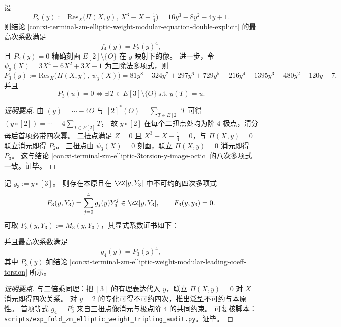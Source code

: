 \begin{conclusion}\label{con:xi-terminal-zm-elliptic-weight-modular-leading-coeff-torsion}
设
\[
P_2(y):=\mathrm{Res}_{X}\!\bigl(\Pi(X,y),\,X^{3}-X+\tfrac14\bigr)=16y^{3}-8y^{2}-4y+1.
\]
则结论 \ref{con:xi-terminal-zm-elliptic-weight-modular-equation-double-explicit} 的最高次系数满足
\[
f_4(y)=P_2(y)^4,
\]
且 \(P_2(y)=0\) 精确刻画 \(E[2]\setminus\{O\}\) 在 \(y\)-映射下的像。
进一步，令 \(\psi_3(X)=3X^4-6X^2+3X-1\) 为三除法多项式，则
\[
P_3(y):=\mathrm{Res}_{X}\!\bigl(\Pi(X,y),\,\psi_3(X)\bigr)
=81y^8-324y^7+297y^6+729y^5-216y^4-1395y^3-480y^2-120y+7,
\]
并且
\[
P_3(u)=0
\Longleftrightarrow
\exists\,T\in E[3]\setminus\{O\}\ \text{s.t.}\ y(T)=u.
\]
\end{conclusion}
\begin{proof}[证明要点]
由 \((y)=\cdots-4O\) 与 \([2]^*(O)=\sum_{T\in E[2]}T\) 可得
\((y\circ[2])=\cdots-4\sum_{T\in E[2]}T\)，
故 \(y\circ[2]\) 在每个二扭点处均为阶 \(4\) 极点，清分母后首项必带四次幂。
二扭点满足 \(Z=0\) 且 \(X^3-X+\tfrac14=0\)，与 \(\Pi(X,y)=0\) 联立消元即得 \(P_2\)。
三扭点由 \(\psi_3(X)=0\) 刻画，联立 \(\Pi(X,y)=0\) 消元即得 \(P_3\)。
这与结论 \ref{con:xi-terminal-zm-elliptic-3torsion-y-image-octic} 的八次多项式一致。证毕。
\end{proof}

\begin{conclusion}\label{con:xi-terminal-zm-elliptic-weight-modular-equation-triple-explicit}
记 \(y_3:=y\circ[3]\)。
则存在本原且在 \(\ZZ[y,Y_3]\) 中不可约的四次多项式
\[
F_3(y,Y_3)=\sum_{j=0}^{4}g_j(y)Y_3^j\in\ZZ[y,Y_3],
\qquad
F_3(y,y_3)=0.
\]
可取 \(F_3(y,Y_3):=M_3(y,Y_3)\)，其显式系数证书如下：

并且最高次系数满足
\[
g_4(y)=P_3(y)^4,
\]
其中 \(P_3(y)\) 如结论 \ref{con:xi-terminal-zm-elliptic-weight-modular-leading-coeff-torsion} 所示。
\end{conclusion}
\begin{proof}[证明要点]
与二倍乘同理：把 \([3]\) 的有理表达代入 \(y\)，联立 \(\Pi(X,y)=0\) 对 \(X\) 消元即得四次关系。
对 \(y=2\) 的专化可得不可约四次，推出泛型不可约与本原性。
首项等式 \(g_4=P_3^4\) 来自三扭点像消元与极点阶 \(4\) 的共同约束。
可复核脚本：\texttt{scripts/exp\_fold\_zm\_elliptic\_weight\_tripling\_audit.py}。证毕。
\end{proof}

